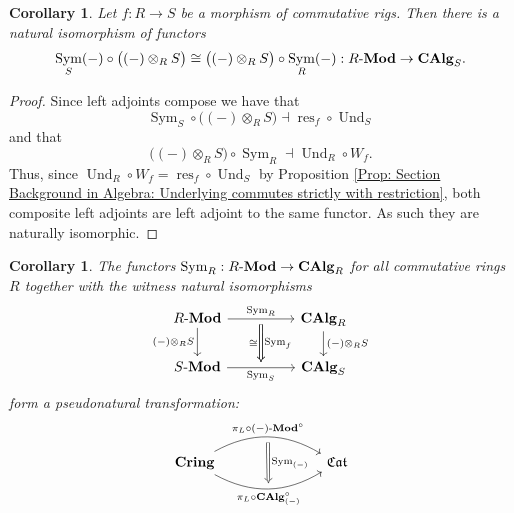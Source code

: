 \documentclass{amsart}
\newtheorem{corollary}[equation]{Corollary}
\theoremstyle{definition}
\DeclareMathOperator{\sym}{Sym}
\DeclareMathOperator{\Crig}{\mathbf{Crig}}
\DeclareMathOperator{\Cring}{\mathbf{Cring}}
\DeclareMathOperator{\fCat}{\mathfrak{Cat}}
\DeclareMathOperator{\res}{res}
\DeclareMathOperator{\op}{op}
\DeclareMathOperator{\und}{Und}
\newcommand{\CAlg}[1]{\mathbf{CAlg}_{#1}}
\newcommand{\Und}[1]{\und_{#1}}
\newcommand{\Sym}[1]{\sym_{#1}}
\newcommand{\Mod}[1]{{#1}\textnormal{-}\mathbf{Mod}}
\numberwithin{equation}{subsection}
\begin{document}
\begin{corollary}\label{Cor: Section Background Alg: Sym and Tensors Commute}
Let $f:R \to S$ be a morphism of commutative rigs. Then there is a natural isomorphism of functors
\[
\Sym{S}(-) \circ \big((-)\otimes_{R}S\big) \cong \big((-) \otimes_{R} S\big) \circ \Sym{R}(-):\Mod{R} \to \CAlg{S}.
\]
\end{corollary}
\begin{proof}
Since left adjoints compose we have that \[
\Sym{S} \circ \big((-) \otimes_{R} S\big) \dashv \res_{f} \circ \Und{S}
\]
and that 
\[
\big((-) \otimes_R S\big) \circ \Sym{R} \dashv \Und{R} \circ W_{f}.
\]
Thus, since $\Und{R} \circ W_{f} = \res_{f} \circ \Und{S}$ by Proposition \ref{Prop: Section Background in Algebra: Underlying commutes strictly with restriction}, both composite left adjoints are left adjoint to the same functor. As such they are naturally isomorphic.
\end{proof}
\begin{corollary}\label{Cor: Section Background Alg: Pseudonat for Sym}
The functors $\Sym{R}:\Mod{R} \to \CAlg{R}$ for all commutative rings $R$ together with the witness natural isomorphisms
\[
\begin{tikzcd}
\Mod{R} \ar[rr, ""{name = U}]{}{\Sym{R}} \ar[d, swap]{}{(-) \otimes_R S} & & \CAlg{R} \ar[d]{}{(-) \otimes_R S} \\
\Mod{S} \ar[rr, swap, ""{name = D}]{}{\Sym{S}} & & \CAlg{S}
\ar[from = U, to = D, Rightarrow, shorten <= 4pt, shorten >= 4pt]{}{\Sym{f}}
\ar[from = U, to = D, Rightarrow, swap, shorten <= 4pt, shorten >= 4pt]{}{\cong}
\end{tikzcd}
\]
form a pseudonatural transformation:
\[
\begin{tikzcd}
	\Cring \ar[rrr, bend left = 30, ""{name = U}]{}{\pi_L \circ \Mod{(-)}^{\circ}} \ar[rrr, bend right = 30, swap, ""{name = D}]{}{\pi_L \circ \CAlg{(-)}^{\circ}} & & & \fCat
	\ar[from = U, to = D, Rightarrow, shorten <= 4pt, shorten >= 4pt]{}{\Sym{(-)}}
\end{tikzcd}
\]
\end{corollary}
\end{document}
